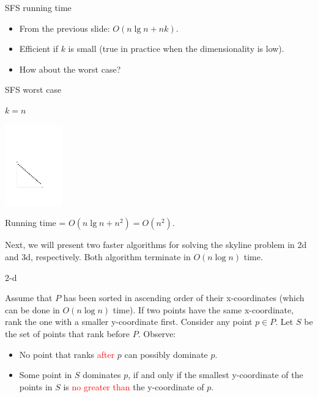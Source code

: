 \documentclass{beamer}
\newcommand{\red}[1]{\textcolor{red}{#1}}
\begin{document}
\begin{frame}{SFS running time}
    \begin{small} \label{fra:sfs-sort}
		\begin{itemize}
		    \item From the previous slide: $O(n \lg n + nk)$.
			\item Efficient if $k$ is small (true in practice when the dimensionality is low).
			\item How about the worst case?
		\end{itemize}
    \end{small}
    \end{frame}
\begin{frame}{SFS worst case}
    \begin{small} \label{fra:sfs-sort}
		$k = n$
		\begin{center}
            \includegraphics[height=35mm]{./artwork/worst.pdf}
        \end{center}

		Running time = $O(n \lg n + n^2) = O(n^2)$.
    \end{small}
    \end{frame}
\begin{frame}{}
    \begin{small} \label{fra:sfs-sort}
		Next, we will present two faster algorithms for solving the skyline problem in 2d and 3d, respectively. Both algorithm terminate in $O(n \log n)$ time.
    \end{small}
    \end{frame}
\begin{frame}{2-d} \label{fra:2d-sort}
\begin{small}
    Assume that $P$ has been sorted in ascending order of their x-coordinates (which can be done in $O(n \log n)$ time). If two points have the same x-coordinate, rank the one with a smaller y-coordinate first. Consider any point $p \in P$. Let $S$ be the set of points that rank before $P$. Observe:
    \begin{itemize}
        \item No point that ranks \red{after} $p$ can possibly dominate $p$.

        \item Some point in $S$ dominates $p$, if and only if the smallest y-coordinate of the points in $S$ is \red{no greater than} the y-coordinate of $p$.
    \end{itemize}
\end{small}
\end{frame}
\end{document}
